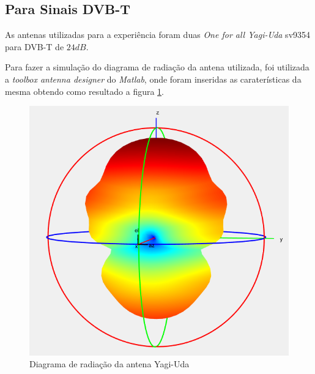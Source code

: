 \subsection{Para Sinais DVB-T}
As antenas utilizadas para a experiência foram duas \textit{One for all Yagi-Uda} sv9354 para \gls{DVB-T} de $24 dB$.\par 
Para fazer a simulação do diagrama de radiação da antena utilizada, foi utilizada a \textit{toolbox antenna designer} do \textit{Matlab}, onde foram inseridas as caraterísticas da mesma obtendo como resultado a figura \ref{fig:yagi}. 

\begin{figure}[h]
\centering
\includegraphics[scale=0.6]{chapters/ch3/assets/yagi}
\caption[Diagrama de radiação antena Yagi-Uda]{Diagrama de radiação da antena Yagi-Uda}
\label{fig:yagi}
\end{figure}
